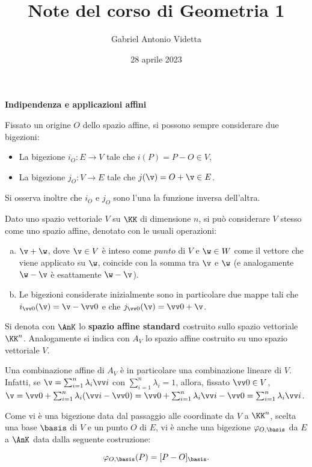 \documentclass[11pt]{article}
\title{\textbf{Note del corso di Geometria 1}}
\author{Gabriel Antonio Videtta}
\date{28 aprile 2023}
\begin{document}
	
	\maketitle
	
	\begin{center}
		\Large \textbf{Indipendenza e applicazioni affini}
	\end{center}
	
	Fissato un origine $O$ dello spazio affine, si possono sempre considerare due
	bigezioni:
	
	\begin{itemize}
		\item La bigezione $i_O : E \to V$ tale che $i(P) = P - O \in V$,
		\item La bigezione $j_O : V \to E$ tale che $j(\v) = O + \v \in E$.
	\end{itemize}
	
	Si osserva inoltre che $i_O$ e $j_O$ sono l'una la funzione inversa dell'altra.
	
	Dato uno spazio vettoriale $V$ su $\KK$ di dimensione $n$, si può considerare $V$ stesso
	come uno spazio affine, denotato  con le usuali operazioni:
	
	\begin{enumerate}[(a)]
		\item $\v + \w$, dove $\v \in V$ è inteso come $\mathit{punto}$ di $V$ e $\w \in W$ come
		il vettore che viene applicato su $\w$, coincide con la somma tra $\v$ e $\w$ (e analogamente
		$\w - \v$ è esattamente $\w - \v$).
		
		\item Le bigezioni considerate inizialmente sono in particolare due mappe tali che
		$i_{\vv 0}(\v) = \v - \vv 0$ e che $j_{\vv 0}(\v) = \vv 0 + \v$.
	\end{enumerate}
	
	\begin{definition} 
		Si denota con $\AnK$ lo \textbf{spazio affine standard} costruito sullo spazio vettoriale
		$\KK^n$. Analogamente si indica con $A_V$ lo spazio affine costruito su uno spazio
		vettoriale $V$.
	\end{definition}

	\begin{remark}\nl
		\li Una combinazione affine di $A_V$ è in particolare una combinazione lineare di $V$. Infatti,
		se $\v = \sum_{i=1}^n \lambda_i \vv i$ con $\sum_{i=1}^n \lambda_i = 1$, allora, fissato
		$\vv 0 \in V$, $\v = \vv 0 + \sum_{i=1}^n \lambda_i (\vv i - \vv 0) = \vv 0 + \sum_{i=1}^n \lambda_i \vv i - \vv 0 = \sum_{i=1}^n \lambda_i \vv i$.
		
		\li Come vi è una bigezione data dal passaggio alle coordinate da $V$ a $\KK^n$, scelta una base
		$\basis$ di $V$ e un punto $O$ di $E$, vi è anche una bigezione $\varphi_{O, \basis}$ da $E$ a $\AnK$ data
		dalla seguente costruzione:
		
		\[ \varphi_{O, \basis}(P) = [P-O]_\basis. \]
	\end{remark}
	
\end{document}
